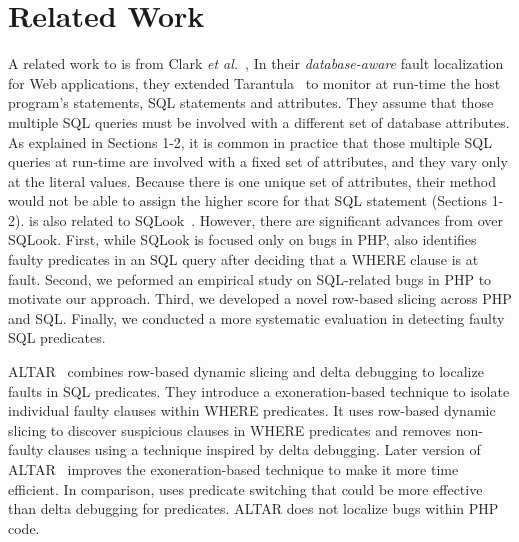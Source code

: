 \section{Related Work}

A related work to {\tool} is from Clark {\em et al.}~\cite{ga-ase11},
In their {\em database-aware} fault localization for Web applications,
they extended Tarantula~\cite{tarantula05} to monitor at run-time the
host program's statements, SQL statements and attributes.
They assume that those multiple SQL queries must be involved with a
different set of database attributes. As explained in Sections 1-2,
it is common in practice that those multiple SQL queries at run-time
are involved with a fixed set of attributes, and they vary only at the
literal values.
Because there is one unique set of attributes, their method would not
be able to assign the higher score for that SQL statement (Sections
1-2).  {\tool} is also related to SQLook~\cite{icsm13}. However, there
are significant advances from {\tool} over SQLook. First, while SQLook
is focused only on bugs in PHP, {\tool} also identifies faulty
predicates in an SQL query after deciding that a WHERE clause is at
fault. Second, we peformed an empirical study on SQL-related bugs in
PHP to motivate our approach. Third, we developed a novel row-based
slicing across PHP and SQL. Finally, we conducted a more systematic
evaluation in detecting faulty SQL predicates.

ALTAR~\cite{altar-icst17} combines row-based dynamic slicing and delta
debugging to localize faults in SQL predicates. They introduce a
exoneration-based technique to isolate individual faulty clauses
within WHERE predicates. It uses row-based dynamic slicing to discover
suspicious clauses in WHERE predicates and removes non-faulty
clauses using a technique inspired by delta debugging. Later version
of ALTAR~\cite{altar-jss19} improves the exoneration-based technique
to make it more time efficient. In comparison, {\tool} uses predicate
switching that could be more effective than delta debugging for
predicates. ALTAR does not localize bugs within PHP code.

